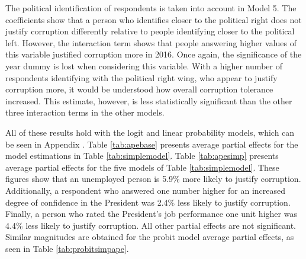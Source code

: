\documentclass[12pt,a4]{article}\usepackage[]{graphicx}\usepackage[]{xcolor}
\begin{document}
The political identification of respondents is taken into account in Model 5. The coefficients show that a person who identifies closer to the political right does not justify corruption differently relative to people identifying closer to the political left. However, the interaction term shows that people answering higher values of this variable justified corruption more in 2016. Once again, the significance of the year dummy is lost when considering this variable. With a higher number of respondents identifying with the political right wing, who appear to justify corruption more, it would be understood how overall corruption tolerance increased. This estimate, however, is less statistically significant than the other three interaction terms in the other models. 

All of these results hold with the logit and linear probability models, which can be seen in Appendix \label{app:second}. Table \ref{tab:apebase} presents average partial effects for the model estimations in Table \ref{tab:simplemodel}. Table \ref{tab:apesimp} presents average partial effects for the five models of Table \ref{tab:simplemodel}. These figures show that an unemployed person is 5.9\% more likely to justify corruption. Additionally, a respondent who answered one number higher for an increased degree of confidence in the President was 2.4\% less likely to justify corruption. Finally, a person who rated the President's job performance one unit higher was 4.4\% less likely to justify corruption. All other partial effects are not significant. Similar magnitudes are obtained for the probit model average partial effects, as seen in Table \ref{tab:probitsimpape}. 
\end{document}
